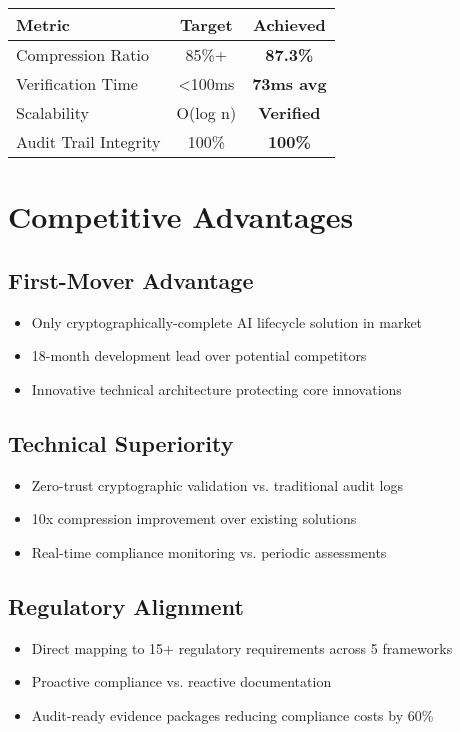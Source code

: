\documentclass[12pt,a4paper]{article}
\begin{document}
\begin{center}
\begin{tabular}{lcc}
\toprule
\textbf{Metric} & \textbf{Target} & \textbf{Achieved} \\
\midrule
Compression Ratio & 85\%+ & \textcolor{success}{\textbf{87.3\%}} \\
Verification Time & <100ms & \textcolor{success}{\textbf{73ms avg}} \\
Scalability & O(log n) & \textcolor{success}{\textbf{Verified}} \\
Audit Trail Integrity & 100\% & \textcolor{success}{\textbf{100\%}} \\
\bottomrule
\end{tabular}
\end{center}

\section{Competitive Advantages}

\subsection{First-Mover Advantage}
\begin{itemize}
    \item Only cryptographically-complete AI lifecycle solution in market
    \item 18-month development lead over potential competitors
    \item Innovative technical architecture protecting core innovations
\end{itemize}

\subsection{Technical Superiority}
\begin{itemize}
    \item Zero-trust cryptographic validation vs. traditional audit logs
    \item 10x compression improvement over existing solutions
    \item Real-time compliance monitoring vs. periodic assessments
\end{itemize}

\subsection{Regulatory Alignment}
\begin{itemize}
    \item Direct mapping to 15+ regulatory requirements across 5 frameworks
    \item Proactive compliance vs. reactive documentation
    \item Audit-ready evidence packages reducing compliance costs by 60\%
\end{itemize}
\end{document}
